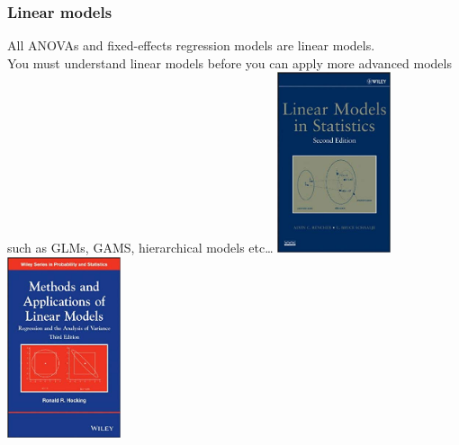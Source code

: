 \documentclass[color=usenames,dvipsnames]{beamer}\usepackage[]{graphicx}\usepackage[]{xcolor}
\begin{document}
\begin{frame}
  \frametitle{Linear models}
  All ANOVAs and fixed-effects regression models are linear models. \\
  \vspace{12pt}
  You must understand linear models before you can apply more advanced
  models such as GLMs, GAMS, hierarchical models etc\dots  
  \vfill
  \centering
  \includegraphics[width=0.25\textwidth]{figure/Rencher_Schaal_book} \hspace{1cm}
  \includegraphics[width=0.25\textwidth]{figure/Hocking_book} \\
\end{frame}
\end{document}
